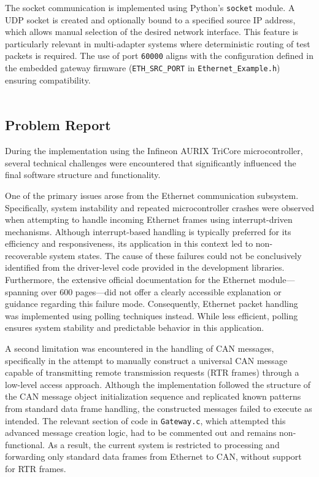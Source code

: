 The socket communication is implemented using Python's \verb|socket| module. A UDP socket is created and optionally bound to a specified source IP address, which allows manual selection of the desired network interface. This feature is particularly relevant in multi-adapter systems where deterministic routing of test packets is required. The use of port \verb|60000| aligns with the configuration defined in the embedded gateway firmware (\verb|ETH_SRC_PORT| in \verb|Ethernet_Example.h|) ensuring compatibility.\\\\

\subsection{Problem Report}

During the implementation using the Infineon AURIX TriCore microcontroller, several technical challenges were encountered that significantly influenced the final software structure and functionality.

One of the primary issues arose from the Ethernet communication subsystem. Specifically, system instability and repeated microcontroller crashes were observed when attempting to handle incoming Ethernet frames using interrupt-driven mechanisms. Although interrupt-based handling is typically preferred for its efficiency and responsiveness, its application in this context led to non-recoverable system states. The cause of these failures could not be conclusively identified from the driver-level code provided in the development libraries. Furthermore, the extensive official documentation for the Ethernet module—spanning over 600 pages—did not offer a clearly accessible explanation or guidance regarding this failure mode. Consequently, Ethernet packet handling was implemented using polling techniques instead. While less efficient, polling ensures system stability and predictable behavior in this application.

A second limitation was encountered in the handling of CAN messages, specifically in the attempt to manually construct a universal CAN message capable of transmitting remote transmission requests (RTR frames) through a low-level access approach. Although the implementation followed the structure of the CAN message object initialization sequence and replicated known patterns from standard data frame handling, the constructed messages failed to execute as intended. The relevant section of code in \verb|Gateway.c|, which attempted this advanced message creation logic, had to be commented out and remains non-functional. As a result, the current system is restricted to processing and forwarding only standard data frames from Ethernet to CAN, without support for RTR frames.

